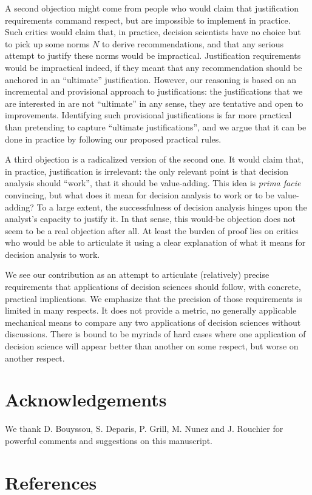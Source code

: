 \documentclass[preprint, french, english, 11pt, authoryear]{elsarticle}%
\begin{document}
A second objection might come from people who would claim that justification requirements command respect, but are impossible to implement in practice. Such critics would claim that, in practice, decision scientists have no choice but to pick up some norms $N$ to derive recommendations, and that any serious attempt to justify these norms would be impractical. Justification requirements would be impractical indeed, if they meant that any recommendation should be anchored in an “ultimate” justification. However, our reasoning is based on an incremental and provisional approach to justifications: the justifications that we are interested in are not ``ultimate'' in any sense, they are tentative and open to improvements. Identifying such provisional justifications is far more practical than pretending to capture ``ultimate justifications'', and we argue that it can be done in practice by following our proposed practical rules.

A third objection is a radicalized version of the second one. It would claim that, in practice, justification is irrelevant: the only relevant point is that decision analysis should ``work'', that it should be value-adding. This idea is \emph{prima facie} convincing, but what does it mean for decision analysis to work or to be value-adding? 
To a large extent, the successfulness of decision analysis hinges upon the analyst's capacity to justify it. In that sense, this would-be objection does not seem to be a real objection after all. At least the burden of proof lies on critics who would be able to articulate it using a clear explanation of what it means for decision analysis to work. 

We see our contribution as an attempt to articulate (relatively) precise requirements that applications of decision sciences should follow, with concrete, practical implications. We emphasize that the precision of those requirements is limited in many respects.
It does not provide a metric, no generally applicable mechanical means to compare any two applications of decision sciences without discussions. There is bound to be myriads of hard cases where one application of decision science will appear better than another on some respect, but worse on another respect.

\setcounter{secnumdepth}{0}
\section{Acknowledgements}
We thank D. Bouyssou, S. Deparis, P. Grill, M. Nunez and J. Rouchier for powerful comments and suggestions on this manuscript.

\section{References}

\end{document}
